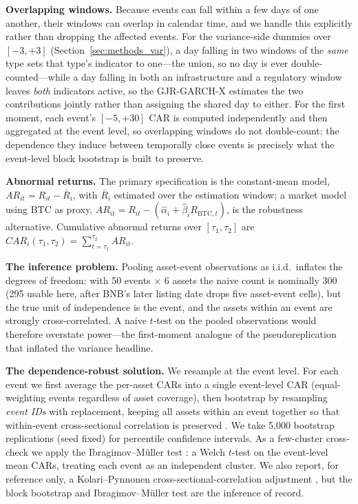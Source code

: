 \documentclass[pdflatex,sn-mathphys-num]{sn-jnl}
\theoremstyle{thmstyleone}
\theoremstyle{thmstyletwo}
\theoremstyle{thmstylethree}
\begin{document}
\textbf{Overlapping windows.} Because events can fall within a few days of one another, their windows can overlap in calendar time, and we handle this explicitly rather than dropping the affected events. For the variance-side dummies over $[-3,+3]$ (Section~\ref{sec:methods_var}), a day falling in two windows of the \emph{same} type sets that type's indicator to one---the union, so no day is ever double-counted---while a day falling in both an infrastructure and a regulatory window leaves \emph{both} indicators active, so the GJR-GARCH-X estimates the two contributions jointly rather than assigning the shared day to either. For the first moment, each event's $[-5,+30]$ CAR is computed independently and then aggregated at the event level, so overlapping windows do not double-count; the dependence they induce between temporally close events is precisely what the event-level block bootstrap is built to preserve.

\textbf{Abnormal returns.} The primary specification is the constant-mean model, $AR_{it} = R_{it} - \bar{R}_i$, with $\bar{R}_i$ estimated over the estimation window; a market model using BTC as proxy, $AR_{it} = R_{it} - (\hat\alpha_i + \hat\beta_i R_{\text{BTC},t})$, is the robustness alternative. Cumulative abnormal returns over $[\tau_1,\tau_2]$ are $CAR_i(\tau_1,\tau_2) = \sum_{t=\tau_1}^{\tau_2} AR_{it}$.

\textbf{The inference problem.} Pooling asset-event observations as i.i.d.\ inflates the degrees of freedom: with 50 events $\times$ 6 assets the naive count is nominally 300 (295 usable here, after BNB's later listing date drops five asset-event cells), but the true unit of independence is the event, and the assets within an event are strongly cross-correlated. A naive $t$-test on the pooled observations would therefore overstate power---the first-moment analogue of the pseudoreplication that inflated the variance headline.

\textbf{The dependence-robust solution.} We resample at the event level. For each event we first average the per-asset CARs into a single event-level CAR (equal-weighting events regardless of asset coverage), then bootstrap by resampling \emph{event IDs} with replacement, keeping all assets within an event together so that within-event cross-sectional correlation is preserved \citep{cameron2008bootstrap, petersen2009estimating, boehmer1991event}. We take 5,000 bootstrap replications (seed fixed) for percentile confidence intervals. As a few-cluster cross-check we apply the Ibragimov--M\"uller test \citep{ibragimov2010tstatistic, mackinnon2023cluster}: a Welch $t$-test on the event-level mean CARs, treating each event as an independent cluster. We also report, for reference only, a Kolari--Pynnonen cross-sectional-correlation adjustment \citep{kolari2010event}, but the block bootstrap and Ibragimov--M\"uller test are the inference of record.
\end{document}
